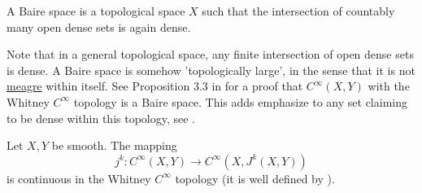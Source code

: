 \documentclass[12pt]{article}
\begin{document}
\begin{definition}
    A Baire space is a topological space $X$ such that the intersection of countably many open dense sets is again dense. 
\end{definition}

Note that in a general topological space, any finite intersection of open dense sets is dense. A Baire space is somehow 'topologically large', in the sense that it is not \href{https://en.wikipedia.org/wiki/Meagre_set}{meagre} within itself. See Proposition 3.3 in \cite{singularities} for a proof that $C^\infty(X, Y)$ with the Whitney $C^\infty$ topology is a Baire space. This adds emphasize to any set claiming to be dense within this topology, see .

\begin{proposition} \label{map to prolongation is cts}
    Let $X, Y$ be smooth. The mapping 
    $$
    j^k: C^\infty(X, Y) \to C^\infty(X, J^k(X, Y))
    $$
    is continuous in the Whitney $C^\infty$ topology (it is well defined by ). 
\end{proposition}
\end{document}
